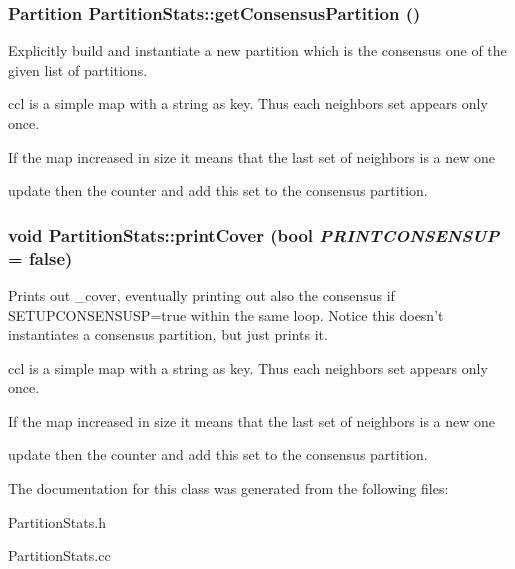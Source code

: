 \subsubsection{\setlength{\rightskip}{0pt plus 5cm}Partition Partition\-Stats::get\-Consensus\-Partition ()}\label{classPartitionStats_a15}


Explicitly build and instantiate a new partition which is the consensus one of the given list of partitions. 

ccl is a simple map with a string as key. Thus each neighbors set appears only once.

If the map increased in size it means that the last set of neighbors is a new one

update then the counter and add this set to the consensus partition. 
\subsubsection{\setlength{\rightskip}{0pt plus 5cm}void Partition\-Stats::print\-Cover (bool {\em PRINTCONSENSUP} = false)}\label{classPartitionStats_a13}


Prints out \_\-cover, eventually printing out also the consensus if SETUPCONSENSUSP=true within the same loop. Notice this doesn't instantiates a consensus partition, but just prints it. 

ccl is a simple map with a string as key. Thus each neighbors set appears only once.

If the map increased in size it means that the last set of neighbors is a new one

update then the counter and add this set to the consensus partition. 

The documentation for this class was generated from the following files:\begin{CompactItemize}
\item 
Partition\-Stats.h\item 
Partition\-Stats.cc\end{CompactItemize}

